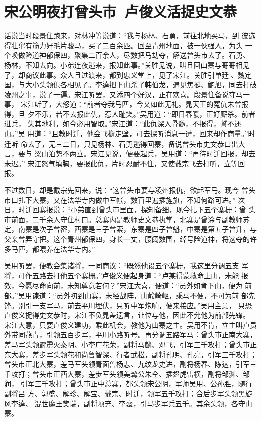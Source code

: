 \chapter{宋公明夜打曾头市~卢俊义活捉史文恭}

话说当时段景住跑来，对林冲等说道：“我与杨林、石勇，前往北地买马，到
彼选得壮窜有筋力好毛片骏马，买了二百余匹。回至青州地面，被一伙强人，为头
一个唤做险道神郁保四，聚集二百余人，尽数把马劫夺，解送曾头市去了。石勇、
杨林，不知去向。小弟连夜逃来，报知此事。”关胜见说，叫且回山寨与哥哥相见
了，却商议此事。众人且过渡来，都到忠义堂上，见了宋江。关胜引单廷、魏定
国，与大小头领俱各相见了。李逵把下山杀了韩伯龙，遇见焦挺、鲍旭，同去打破
凌州之事，说了一遍。宋江听罢，又添四个好汉，正在欢喜。段景住备说夺马一事，
宋江听了，大怒道：“前者夺我马匹，今又如此无礼。晁天王的冤仇未曾报得，旦
夕不乐，若不去报此仇，惹人耻笑。”吴用道：“即日春暖，正好厮杀。前者进兵，
失其地利，如今必用智取。”宋江道：“此仇深入骨髓，不报得，誓不还山。”吴
用道：“且教时迁，他会飞檐走壁，可去探听消息一遭，回来却作商量。”时迁听
命去了，无三二日，只见杨林、石勇逃得回寨，备说曾头市史文恭口出大言，要与
梁山泊势不两立。宋江见说，便要起兵，吴用道：“再待时迁回报，却去未迟。”
宋江怒气填胸，要报此仇，片时忍耐不住，又使戴宗飞去打听，立等回报。

不过数日，却是戴宗先回来，说：“这曾头市要与凌州报仇，欲起军马。现今
曾头市口扎下大寨，又在法华寺内做中军帐，数百里遍插旌旗，不知何路可进。”
次日，时迁回寨报说：“小弟直到曾头市里面，探知备细，现今扎下五个寨栅：曾
头市前面，二千余人守住村口。总寨内是教师史文恭执掌，北寨是曾涂与副教师苏
定，南寨是次子曾密，西寨是三子曾索，东寨是四子曾魁，中寨是第五子曾升，与
父亲曾弄守把。这个青州郁保四，身长一丈，腰阔数围，绰号险道神，将这夺的许
多马匹，都喂养在法华寺内。”

吴用听罢，便教会集诸将，一同商议：“既然他设五个寨栅，我这里分调五支
军将，可作五路去打他五个寨栅。”卢俊义便起身道：“卢某得蒙救命上山，未能
报效，今愿尽命向前，未知尊意若何？”宋江大喜，便道：“员外如肯下山，便为
前部。”吴用谏道：“员外初到山寨，未经战阵，山岭崎岖，乘马不便，不可为前
部先锋。别引一支军马，前去平川埋伏，只听中军炮响，便来接应。”吴用主意，
只恐卢俊义捉得史文恭时，宋江不负晁盖遗言，让位与他，因此不允他为前部先锋。
宋江大意，只要卢俊义建功，乘此机会，教他为山寨之主。吴用不肯，立主叫卢员
外带同燕青，引领五百步军，平川小路听号。再分调五路军马：曾头市正南大寨，
差马军头领霹雳火秦明、小李广花荣，副将马麟、邓飞，引军三千攻打；曾头市正
东大寨，差步军头领花和尚鲁智深、行者武松，副将孔明、孔亮，引军三千攻打；
曾头市正北大寨，差马军头领青面兽杨志、九纹龙史进，副将杨春、陈达，引军三
千攻打；曾头市正西大寨，差步军头领美髯公朱仝、插翅虎雷横，副将邹渊、邹润，
引军三千攻打；曾头市正中总寨，都头领宋公明，军师吴用、公孙胜，随行副将吕
方、郭盛、解珍、解宝、戴宗、时迁，领军五千攻打；合后步军头领黑旋风李逵、
混世魔王樊瑞，副将项充、李衮，引马步军兵五千。其余头领，各守山寨。

